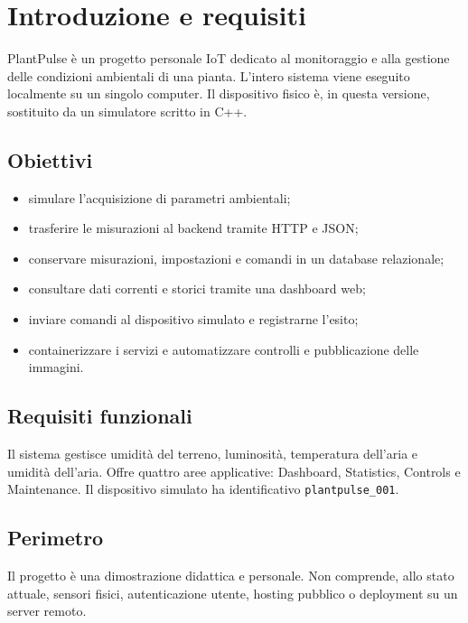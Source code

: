 \chapter{Introduzione e requisiti}

PlantPulse è un progetto personale IoT dedicato al monitoraggio e alla gestione delle condizioni ambientali di una pianta. L'intero sistema viene eseguito localmente su un singolo computer. Il dispositivo fisico è, in questa versione, sostituito da un simulatore scritto in C++.

\section{Obiettivi}
\begin{itemize}
    \item simulare l'acquisizione di parametri ambientali;
    \item trasferire le misurazioni al backend tramite HTTP e JSON;
    \item conservare misurazioni, impostazioni e comandi in un database relazionale;
    \item consultare dati correnti e storici tramite una dashboard web;
    \item inviare comandi al dispositivo simulato e registrarne l'esito;
    \item containerizzare i servizi e automatizzare controlli e pubblicazione delle immagini.
\end{itemize}

\section{Requisiti funzionali}
Il sistema gestisce umidità del terreno, luminosità, temperatura dell'aria e umidità dell'aria. Offre quattro aree applicative: Dashboard, Statistics, Controls e Maintenance. Il dispositivo simulato ha identificativo \texttt{plantpulse\_001}.

\section{Perimetro}
Il progetto è una dimostrazione didattica e personale. Non comprende, allo stato attuale, sensori fisici, autenticazione utente, hosting pubblico o deployment su un server remoto.
